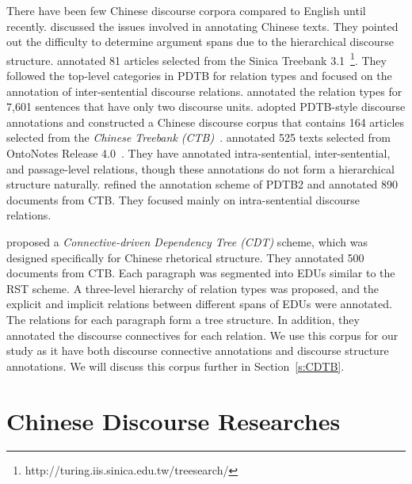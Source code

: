 There have been few Chinese discourse corpora compared to English until recently.
\cite{xue2005annotating} discussed the issues involved in annotating Chinese texts. They
pointed out the difficulty to determine argument spans due to the hierarchical
discourse structure. \cite{huang2011chinese} annotated 81 articles selected from
the Sinica Treebank 3.1~\footnote{http://turing.iis.sinica.edu.tw/treesearch/}. They followed
the top-level categories in PDTB for relation types and focused on the annotation
of inter-sentential discourse relations. \cite{huang2014interpretation} annotated the
relation types for 7,601 sentences that have only two discourse units.
\cite{zhou2012pdtb,zhou2015the} adopted PDTB-style discourse annotations and constructed
a Chinese discourse corpus that contains 164 articles selected from the \textit{Chinese
Treebank (CTB)}~\citep{xue2005penn}. \cite{zhang2014chinese} annotated 525 texts selected
from OntoNotes Release 4.0~\citep{weischedel_ontonotes_2011}. They have annotated
intra-sentential, inter-sentential, and passage-level relations, though
these annotations do not form a hierarchical structure naturally. \cite{zhou2014the}
refined the annotation scheme of PDTB2 and annotated 890 documents from CTB.
They focused mainly on intra-sentential discourse relations.

\cite{li2014building} proposed a \textit{Connective-driven Dependency Tree (CDT)}
scheme, which was designed specifically for Chinese rhetorical structure. They
annotated 500 documents from CTB. Each paragraph was segmented into EDUs similar
to the RST scheme. A three-level hierarchy of relation types was
proposed, and the explicit and implicit relations between different spans of EDUs
were annotated. The relations for each paragraph form a tree structure. In addition,
they annotated the discourse connectives for each relation. We use this corpus
for our study as it have both discourse connective annotations and discourse
structure annotations. We will discuss this corpus further in Section~\ref{s:CDTB}.

\section{Chinese Discourse Researches}


